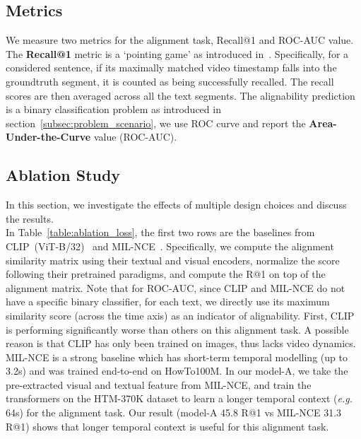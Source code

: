 \vspace{-2mm}
\subsection{Metrics}
\vspace{-1mm}
We measure two metrics for the alignment task, Recall@1 and ROC-AUC value.
The \textbf{Recall@1} metric is a `pointing game' as introduced in~\cite{Zhukov2019}.
Specifically, for a considered sentence, 
if its maximally matched video timestamp falls into the groundtruth segment,
it is counted as being successfully recalled. 
The recall scores are then averaged across all the text segments.
The alignability prediction is a binary classification problem as introduced in section~\ref{subsec:problem_scenario},
we use ROC curve and report the \textbf{Area-Under-the-Curve} value (ROC-AUC).

\vspace{-2mm}
\subsection{Ablation Study}
\vspace{-1mm}
\label{subsec:ablation}
In this section, we investigate the effects of multiple design choices and discuss the results.\\[-8pt]

\vspace{-1mm}
In Table~\ref{table:ablation_loss}, 
the first two rows are the baselines from CLIP~(ViT-B/32)~\cite{Radford21} and MIL-NCE~\cite{Miech20}.
Specifically, we compute the alignment similarity matrix using their textual and visual encoders, 
normalize the score following their pretrained paradigms, and compute the R@1 on top of the alignment matrix. 
Note that for ROC-AUC, since CLIP and MIL-NCE do not have a specific binary classifier,
for each text, we directly use its maximum similarity score (across the time axis) as an indicator of alignability.
First, CLIP~\cite{Radford21} is performing significantly worse than others on this alignment task.
A possible reason is that CLIP has only been trained on images, thus lacks video dynamics.
MIL-NCE is a strong baseline which has short-term temporal modelling (up to 3.2s) 
and was trained end-to-end on HowTo100M.
In our model-A, we take the pre-extracted visual and textual feature from MIL-NCE,
and train the transformers on the HTM-370K dataset
to learn a longer temporal context ({\em e.g.} 64s) for the alignment task.
Our result (model-A 45.8 R@1 vs MIL-NCE 31.3 R@1) shows that longer temporal context is useful for this alignment task. \\[-8pt]

